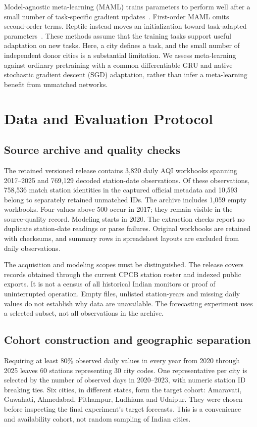 \documentclass[conference]{IEEEtran}
\begin{document}
Model-agnostic meta-learning (MAML) trains parameters to perform well after a small number of task-specific gradient updates~\cite{maml}. First-order MAML omits second-order terms. Reptile instead moves an initialization toward task-adapted parameters~\cite{reptile}. These methods assume that the training tasks support useful adaptation on new tasks. Here, a city defines a task, and the small number of independent donor cities is a substantial limitation. We assess meta-learning against ordinary pretraining with a common differentiable GRU and native stochastic gradient descent (SGD) adaptation, rather than infer a meta-learning benefit from unmatched networks.

\section{Data and Evaluation Protocol}
\subsection{Source archive and quality checks}
The retained versioned release contains 3,820 daily AQI workbooks spanning 2017--2025 and 769,129 decoded station-date observations. Of these observations, 758,536 match station identities in the captured official metadata and 10,593 belong to separately retained unmatched IDs. The archive includes 1,059 empty workbooks. Four values above 500 occur in 2017; they remain visible in the source-quality record. Modeling starts in 2020. The extraction checks report no duplicate station-date readings or parse failures. Original workbooks are retained with checksums, and summary rows in spreadsheet layouts are excluded from daily observations.

The acquisition and modeling scopes must be distinguished. The release covers records obtained through the current CPCB station roster and indexed public exports. It is not a census of all historical Indian monitors or proof of uninterrupted operation. Empty files, unlisted station-years and missing daily values do not establish why data are unavailable. The forecasting experiment uses a selected subset, not all observations in the archive.

\subsection{Cohort construction and geographic separation}
Requiring at least 80\% observed daily values in every year from 2020 through 2025 leaves 60 stations representing 30 city codes. One representative per city is selected by the number of observed days in 2020--2023, with numeric station ID breaking ties. Six cities, in different states, form the target cohort: Amaravati, Guwahati, Ahmedabad, Pithampur, Ludhiana and Udaipur. They were chosen before inspecting the final experiment's target forecasts. This is a convenience and availability cohort, not random sampling of Indian cities.
\end{document}
